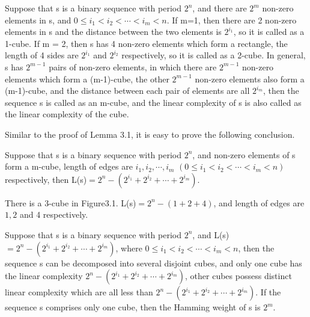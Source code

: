 \documentclass[10pt,conference,twocolumn]{IEEEtran}
\begin{document}
 Suppose that s is a binary sequence
with period $2^n$, and there are $2^m$ non-zero elements in s, and
$0\le i_1< i_2<\cdots<i_m<n$. If m=1, then there are 2 non-zero
elements in s and the distance between the two elements is
$2^{i_1}$, so it is called as a 1-cube. If m = 2, then s has 4
non-zero elements which form a rectangle, the length of 4 sides are
$2^{i_1}$ and $2^{i_2}$ respectively, so it is called as a 2-cube.
In general, s has $2^{m-1}$ pairs of non-zero elements, in which
there are $2^{m-1}$ non-zero elements which form a (m-1)-cube, the
other $2^{m-1}$ non-zero elements also form a (m-1)-cube, and the
distance between each pair of elements are all  $2^{i_m}$, then the
sequence s is called as an m-cube, and the linear complexity of s is
also called as the linear complexity of the cube.

Similar to the proof of Lemma 3.1, it is easy to prove the following
conclusion.

 Suppose that s is a binary sequence
with period $2^n$, and non-zero elements of s form a m-cube, length
of  edges are $ i_1, i_2,\cdots ,i_m$ $(0\le i_1< i_2<\cdots<i_m<n
)$ respectively, then L(s)$=2^n-(2^{i_1}+2^{i_2}+\cdots+2^{i_m})$.


There is a 3-cube in Figure3.1. L(s)$=2^n-(1+2+4)$, and length of
edges are $1,2$ and 4 respectively.

 Suppose that s is a binary sequence
with period $2^n$, and L(s)$=2^n-(2^{i_1}+2^{i_2}+\cdots+2^{i_m})$,
where $0\le i_1< i_2<\cdots<i_m<n$, then the sequence s can be
decomposed into several disjoint cubes, and only one cube has the
linear complexity $2^n-(2^{i_1}+2^{i_2}+\cdots+2^{i_m})$, other
cubes possess distinct linear complexity which are all less than
$2^n-(2^{i_1}+2^{i_2}+\cdots+2^{i_m})$. If the sequence s comprises
only one cube, then the Hamming weight of s is $2^m$.
\end{document}
